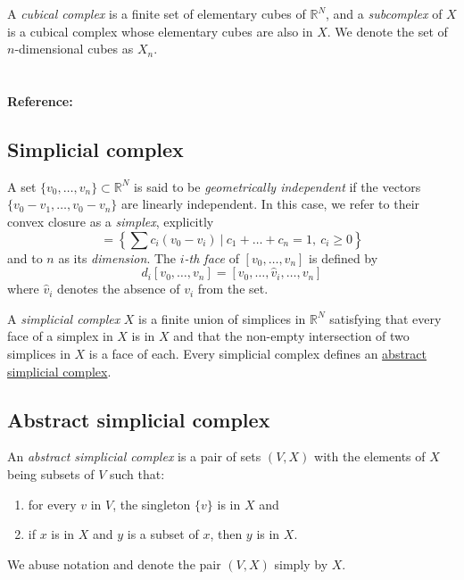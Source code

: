 \documentclass{amsart}
\begin{document}
	A \textit{cubical complex} is a finite set of elementary cubes of $\mathbb{R}^N$, and a \textit{subcomplex} of $X$ is a cubical complex whose elementary cubes are also in $X$. We denote the set of $n$-dimensional cubes as $X_n$.
	
	\paragraph{\\ Reference:} \cite{mischaikow04computational}
	
	\subsection*{Simplicial complex} \label{simplicial complex}
	
	A set $\{v_0, \dots, v_n\} \subset \mathbb{R}^N$ is said to be \textit{geometrically independent} if the vectors $\{v_0-v_1, \dots, v_0-v_n\}$ are linearly independent. In this case, we refer to their convex closure as a \textit{simplex}, explicitly
	\begin{equation*}
	[v_0,\dots ,v_n] = \left\{ \sum c_i (v_0 - v_i)\ \big|\ c_1+\dots+c_n = 1,\ c_i \geq 0 \right\}
	\end{equation*}
	and to $n$ as its \textit{dimension}. The \textit{$i$-th face} of $[v_0, \dots, v_n]$ is defined by
	\begin{equation*}
	d_i[v_0, \dots, v_n] = [v_0, \dots, \widehat{v}_i, \dots, v_n]
	\end{equation*}
	where $\widehat{v}_i$ denotes the absence of $v_i$ from the set.
	
	A \textit{simplicial complex} $X$ is a finite union of simplices in $\mathbb{R}^N$ satisfying that every face of a simplex in $X$ is in $X$ and that the non-empty intersection of two simplices in $X$ is a face of each. Every simplicial complex defines an \hyperref[abstract simplicial complex]{abstract simplicial complex}.
	
	\subsection*{Abstract simplicial complex} \label{abstract simplicial complex}
	
	An \textit{abstract simplicial complex} is a pair of sets $(V, X)$ with the elements of $X$ being subsets of $V$ such that: 
	\begin{enumerate}
		\item for every $v$ in $V$, the singleton $\{v\}$ is in $X$ and
		\item if $x$ is in $X$ and $y$ is a subset of $x$, then $y$ is in $X$. 
	\end{enumerate}
	We abuse notation and denote the pair $(V, X)$ simply by $X$.
	
\end{document}
